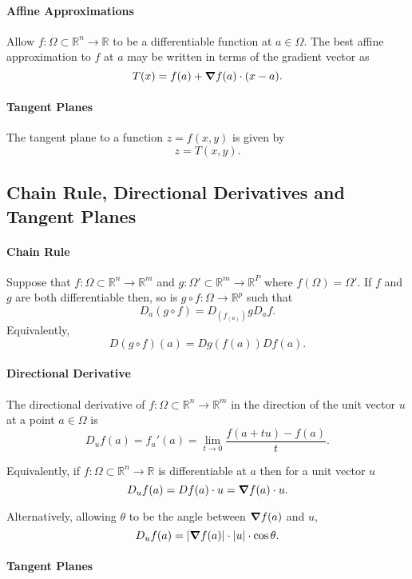 \paragraph{Affine Approximations}
Allow \(f:\Omega\subset\mathbb{R}^n \to \mathbb{R}\) to be a differentiable
function at \(a\in \Omega\).
The best affine approximation to \(f\) at \(a\) may be written in terms of
the gradient vector as
\[
    T(x) = f(a) + \grad f(a) \cdot (x-a).
\]

\paragraph{Tangent Planes}
The tangent plane to a function \(z = f(x, y)\) is given by
\[ z = T(x, y).\]

\subsection{Chain Rule, Directional Derivatives and Tangent Planes}

\paragraph{Chain Rule}
Suppose that \(f: \Omega \subset \mathbb{R}^n \to \mathbb{R}^m\) and
\(g: \Omega' \subset \mathbb{R}^m \to \mathbb{R}^P\) where
\(f(\Omega) = \Omega'\).
If \(f\) and \(g\) are both differentiable then, so is
\(g\circ f: \Omega \to \mathbb{R}^p\) such that
\[
    D_a (g\circ f) = D_(f_(a))g D_a f.
\]
Equivalently,
\[
    D(g\circ f)(a) = Dg(f(a)) Df(a).
\]

\paragraph{Directional Derivative}
The directional derivative of 
\(f: \Omega \subset \mathbb{R}^n \to \mathbb{R}^m\)
in the direction of the unit vector \(u\) at a point \(a\in\Omega\) is
\[
    D_u f(a) = f_{u}'(a)
    =
    \lim_{t\to 0}  \dfrac{f(a + t u) - f(a)}{t}.
\]

Equivalently, if \(f: \Omega \subset \mathbb{R}^n \to \mathbb{R}\)
is differentiable at \(a\) then for a unit vector \(u\)
\[
    D_u f(a) = Df(a) \cdot u = \grad f(a)\cdot u.
\]

Alternatively, allowing \(\theta\) to be the angle between
\(\grad f(a)\) and \(u\),
\[D_u f(a) = |\grad f(a)| \cdot |u| \cdot \cos\theta.\]

\paragraph{Tangent Planes}

